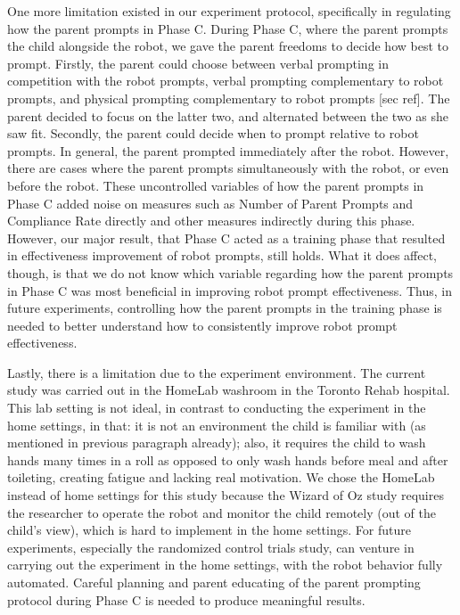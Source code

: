 \documentclass{ut-thesis}
\begin{document}
One more limitation existed in our experiment protocol, specifically in regulating how the parent prompts in Phase C.  During Phase C, where the parent prompts the child alongside the robot, we gave the parent freedoms to decide how best to prompt.  Firstly, the parent could choose between verbal prompting in competition with the robot prompts, verbal prompting complementary to robot prompts, and physical prompting complementary to robot prompts [sec ref].  The parent decided to focus on the latter two, and alternated between the two as she saw fit.  Secondly, the parent could decide when to prompt relative to robot prompts.  In general, the parent prompted immediately after the robot.  However, there are cases where the parent prompts simultaneously with the robot, or even before the robot.  These uncontrolled variables of how the parent prompts in Phase C added noise on measures such as Number of Parent Prompts and Compliance Rate directly and other measures indirectly during this phase.  However, our major result, that Phase C acted as a training phase that resulted in effectiveness improvement of robot prompts, still holds.  What it does affect, though, is that we do not know which variable regarding how the parent prompts in Phase C was most beneficial in improving robot prompt effectiveness.  Thus, in future experiments, controlling how the parent prompts in the training phase is needed to better understand how to consistently improve robot prompt effectiveness.

Lastly, there is a limitation due to the experiment environment.  The current study was carried out in the HomeLab washroom in the Toronto Rehab hospital.  This lab setting is not ideal, in contrast to conducting the experiment in the home settings, in that: it is not an environment the child is familiar with (as mentioned in previous paragraph already); also, it requires the child to wash hands many times in a roll as opposed to only wash hands before meal and after toileting, creating fatigue and lacking real motivation.  We chose the HomeLab instead of home settings for this study because the Wizard of Oz study requires the researcher to operate the robot and monitor the child remotely (out of the child's view), which is hard to implement in the home settings.  For future experiments, especially the randomized control trials study, can venture in carrying out the experiment in the home settings, with the robot behavior fully automated.  Careful planning and parent educating of the parent prompting protocol during Phase C is needed to produce meaningful results.
\end{document}
